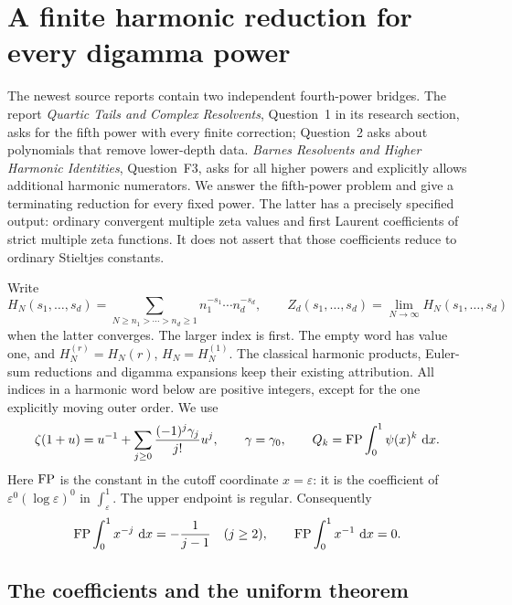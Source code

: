 \section{A finite harmonic reduction for every digamma power}
\label{hp:sec:all}

The newest source reports contain two independent fourth-power bridges.
The report \emph{Quartic Tails and Complex Resolvents}, Question~1 in its
research section, asks for the fifth power with every finite correction\cite{repo:quartic};
Question~2 asks about polynomials that remove lower-depth data.
\emph{Barnes Resolvents and Higher Harmonic Identities}, Question~F3, asks for
all higher powers and explicitly allows additional harmonic numerators\cite{repo:barnes}.
We answer the fifth-power problem and give a terminating reduction for
every fixed power. The latter has a precisely specified output: ordinary
convergent multiple zeta values and first Laurent coefficients of strict
multiple zeta functions. It does not assert that those coefficients
reduce to ordinary Stieltjes constants.

Write
\[
 H_N(s_1,\ldots,s_d)
   =\sum_{N\ge n_1>\cdots>n_d\ge1}
             n_1^{-s_1}\cdots n_d^{-s_d},\qquad
 Z_d(s_1,\ldots,s_d)=\lim_{N\to\infty}H_N(s_1,\ldots,s_d)
\]
when the latter converges. The larger index is first. The empty word
has value one, and $H_N^{(r)}=H_N(r)$, $H_N=H_N^{(1)}$.
The classical harmonic products, Euler-sum reductions and digamma
expansions keep their existing attribution\cite{dlmf:psi,hoffman,mezo}.
All indices in a harmonic word below are positive integers, except
for the one explicitly moving outer order. We use
\[
 \zeta(1+u)=u^{-1}+\sum_{j\ge0}\frac{(-1)^j\gamma_j}{j!}u^j,
 \qquad \gamma=\gamma_0,
 \qquad Q_k=\operatorname{FP}\int_0^1\psi(x)^k\,\,\mathrm d x.
\]
Here $\operatorname{FP}$ is the constant in the cutoff coordinate $x=\varepsilon$:
it is the coefficient of $\varepsilon^0(\log\varepsilon)^0$ in
$\int_\varepsilon^1$. The upper endpoint is regular. Consequently
\[
 \operatorname{FP}\int_0^1x^{-j}\,\,\mathrm d x=-\frac1{j-1}\quad(j\ge2),
 \qquad \operatorname{FP}\int_0^1x^{-1}\,\,\mathrm d x=0.
\]

\subsection{The coefficients and the uniform theorem}

